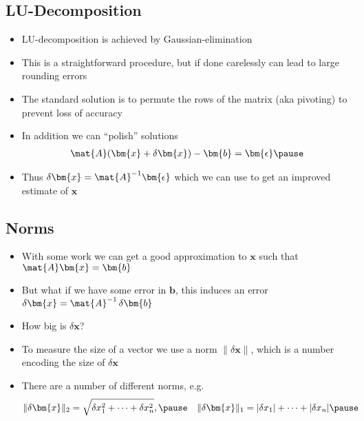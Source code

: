 \begin{slide}
\section{LU-Decomposition}

\begin{PauseHighLight}
  \begin{itemize}
  \item LU-decomposition is achieved by Gaussian-elimination\pause
  \item This is a straightforward procedure, but if done carelessly can
    lead to large rounding errors\pause
  \item The standard solution is to permute the rows of the
    matrix (aka pivoting) to prevent loss of accuracy\pause
  \item In addition we can ``polish'' solutions
    \begin{align*}
      \mat{A} (\bm{x} + \delta\bm{x}) - \bm{b} = \bm{\epsilon}\pause
    \end{align*}
  \item Thus $\delta\bm{x} = \mat{A}^{-1} \bm{\epsilon}$ which we can
    use to get an improved estimate of $\bm{x}$\pause
  \end{itemize}
\end{PauseHighLight}

\end{slide}


\begin{slide}
\section{Norms}

\begin{PauseHighLight}
  \begin{itemize}
  \item With some work we can get a good approximation to $\bm{x}$ such
    that $\mat{A} \bm{x} = \bm{b}$\pause
  \item But what if we have some error in $\bm{b}$, this induces an
    error $\delta \bm{x} = \mat{A}^{-1} \, \delta\bm{b}$\pause
  \item How big is $\delta \bm{x}$?\pause
  \item To measure the size of a vector we use a norm $\|\delta
    \bm{x}\|$, which is a number encoding the size of $\delta \bm{x}$
    \pause
  \item There are a number of different norms, e.g.
    \begin{align*}
      \|\delta \bm{x}\|_2 &= \sqrt{\delta x_1^2 + \cdots +
        \delta x_n^2}, \pause &
      \|\delta \bm{x}\|_1 &= |\delta x_1| + \cdots +
        |\delta x_n| \pause
    \end{align*}
  \end{itemize}
\end{PauseHighLight}

\end{slide}

